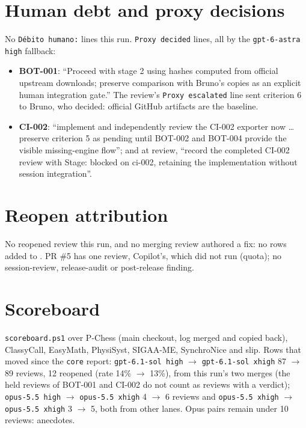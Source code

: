 \documentclass[11pt,a4paper]{article}
\begin{document}
\section*{Human debt and proxy decisions}

No \texttt{Débito humano:} lines this run. \texttt{Proxy decided} lines, all by the
\texttt{gpt-6-astra high} fallback:

\begin{itemize}
  \item \textbf{BOT-001}: ``Proceed with stage 2 using hashes computed from official upstream
        downloads; preserve comparison with Bruno's copies as an explicit human integration
        gate.'' The review's \texttt{Proxy escalated} line sent criterion 6 to Bruno, who
        decided: official GitHub artifacts are the baseline.
  \item \textbf{CI-002}: ``implement and independently review the CI-002 exporter now
        \ldots{} preserve criterion 5 as pending until BOT-002 and BOT-004 provide the visible
        missing-engine flow''; and at review, ``record the completed CI-002 review with
        Stage: blocked on ci-002, retaining the implementation without session
        integration''.
\end{itemize}

\section*{Reopen attribution}

No reopened review this run, and no merging review authored a fix: no rows added to
. PR \#5 has one review, Copilot's, which did not run
(quota); no session-review, release-audit or post-release finding.

\section*{Scoreboard}

\texttt{scoreboard.ps1} over P-Chess (main checkout, log merged and copied back), ClassyCall,
EasyMath, PhysiSyst, SIGAA-ME, SynchroNice and slip. Rows that moved since the
\texttt{core} report: \texttt{gpt-6.1-sol high} $\rightarrow$ \texttt{gpt-6.1-sol xhigh} 87
$\rightarrow$ 89 reviews, 12 reopened (rate 14\% $\rightarrow$ 13\%), from this run's two
merges (the held reviews of BOT-001 and CI-002 do not count as reviews with a verdict);
\texttt{opus-5.5 high} $\rightarrow$ \texttt{opus-5.5 xhigh} 4 $\rightarrow$ 6 reviews and
\texttt{opus-5.5 xhigh} $\rightarrow$ \texttt{opus-5.5 xhigh} 3 $\rightarrow$ 5, both from
other lanes. Opus pairs remain under 10 reviews: anecdotes.
\end{document}
